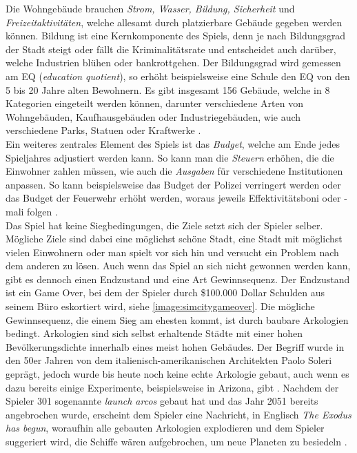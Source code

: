 Die Wohngebäude brauchen \textit{Strom, Wasser, Bildung, Sicherheit} und \textit{Freizeitaktivitäten}, welche allesamt durch platzierbare Gebäude gegeben werden können. Bildung ist eine Kernkomponente des Spiels, denn je nach Bildungsgrad der Stadt steigt oder fällt die Kriminalitätsrate und entscheidet auch darüber, welche Industrien blühen oder bankrottgehen. Der Bildungsgrad wird gemessen am EQ (\textit{education quotient}), so erhöht beispielsweise eine Schule den EQ von den 5 bis 20 Jahre alten Bewohnern. Es gibt insgesamt 156 Gebäude, welche in 8 Kategorien eingeteilt werden können, darunter verschiedene Arten von Wohngebäuden, Kaufhausgebäuden oder Industriegebäuden, wie auch verschiedene Parks, Statuen oder Kraftwerke \cite*[]{simcity:fandom}. \\
Ein weiteres zentrales Element des Spiels ist das \textit{Budget}, welche am Ende jedes Spieljahres adjustiert werden kann. So kann man die \textit{Steuern} erhöhen, die die Einwohner zahlen müssen, wie auch die \textit{Ausgaben} für verschiedene Institutionen anpassen. So kann beispielsweise das Budget der Polizei verringert werden oder das Budget der Feuerwehr erhöht werden, woraus jeweils Effektivitätsboni oder -mali folgen \cite*[]{simcity:video}. \\
Das Spiel hat keine Siegbedingungen, die Ziele setzt sich der Spieler selber. Mögliche Ziele sind dabei eine möglichst schöne Stadt, eine Stadt mit möglichst vielen Einwohnern oder man spielt vor sich hin und versucht ein Problem nach dem anderen zu lösen. Auch wenn das Spiel an sich nicht gewonnen werden kann, gibt es dennoch einen Endzustand und eine Art Gewinnsequenz. Der Endzustand ist ein Game Over, bei dem der Spieler durch \$100.000 Dollar Schulden aus \glqq seinem Büro eskortiert wird\grqq, siehe \autoref{image:simcitygameover}. Die mögliche Gewinnsequenz, die einem Sieg am ehesten kommt, ist durch baubare Arkologien bedingt. Arkologien sind sich selbst erhaltende Städte mit einer hohen Bevölkerungsdichte innerhalb eines meist hohen Gebäudes. Der Begriff wurde in den 50er Jahren von dem italienisch-amerikanischen Architekten Paolo Soleri geprägt, jedoch wurde bis heute noch keine echte Arkologie gebaut, auch wenn es dazu bereits einige Experimente, beispielsweise in Arizona, gibt \cite*[]{misc:arcology}. Nachdem der Spieler 301 sogenannte \textit{launch arcos} gebaut hat und das Jahr 2051 bereits angebrochen wurde, erscheint dem Spieler eine Nachricht, in Englisch \textit{\glqq The Exodus has begun\grqq}, woraufhin alle gebauten Arkologien explodieren und dem Spieler suggeriert wird, die Schiffe wären aufgebrochen, um neue Planeten zu besiedeln \cite*[]{simcity:arcology}. \\
